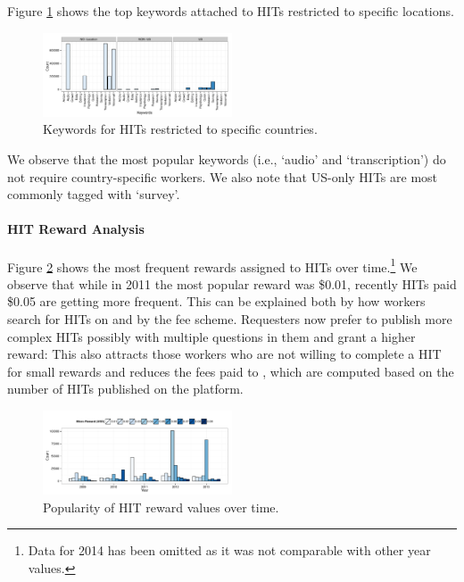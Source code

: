 Figure \ref{fig:keyword_loc} shows the top keywords attached to HITs restricted to specific locations.
\begin{figure}[tb]
	\centering
		\includegraphics[width=0.5\textwidth]{figures/keywords_location}
	\caption{Keywords for HITs restricted to specific countries.}
	\label{fig:keyword_loc}
\end{figure}
We observe that the most popular keywords (i.e., `audio' and `transcription') do not require country-specific workers. 
We also note that US-only HITs are most commonly tagged with `survey'.


\vspace{0.3cm}
\paragraph{HIT Reward Analysis}
Figure \ref{fig:reward_year} shows the most frequent rewards assigned to HITs over time.\footnote{Data for 2014 has been omitted as it was not comparable with other year values.} We observe that while in 2011 the most popular reward was \$0.01, recently HITs paid \$0.05 are getting more frequent. This can be explained both by how workers search for HITs on \amt{} and by the \amt{} fee scheme. Requesters now prefer to publish more complex HITs possibly with multiple questions in them and grant a higher reward: This also attracts those workers who are not willing to complete a HIT for small rewards and reduces the fees paid to \amt{}, which are computed based on the number of HITs published on the platform.

\begin{figure}[tb]
	\centering
		\includegraphics[width=0.5\textwidth]{figures/reward_year}
	\caption{Popularity of HIT reward values over time.}
	\label{fig:reward_year}
\end{figure}



